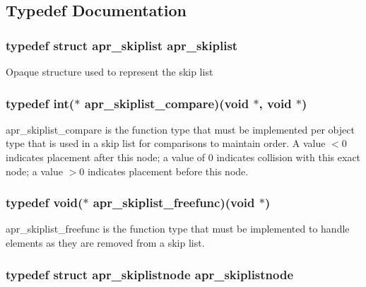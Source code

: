 \subsection{Typedef Documentation}
\hypertarget{group__apr__skiplist_gac79ddf14bb5cb5b6d35961309eadec48}{
\subsubsection[{apr\-\_\-skiplist}]{\setlength{\rightskip}{0pt plus 5cm}typedef struct {\bf apr\-\_\-skiplist} {\bf apr\-\_\-skiplist}}}\label{group__apr__skiplist_gac79ddf14bb5cb5b6d35961309eadec48}
Opaque structure used to represent the skip list \hypertarget{group__apr__skiplist_ga4e5bca4c34a9932deee61c3ac4ed7d4a}{
\subsubsection[{apr\-\_\-skiplist\-\_\-compare}]{\setlength{\rightskip}{0pt plus 5cm}typedef int($\ast$ apr\-\_\-skiplist\-\_\-compare)(void $\ast$, void $\ast$)}}\label{group__apr__skiplist_ga4e5bca4c34a9932deee61c3ac4ed7d4a}
apr\-\_\-skiplist\-\_\-compare is the function type that must be implemented per object type that is used in a skip list for comparisons to maintain order. A value $<$0 indicates placement after this node; a value of 0 indicates collision with this exact node; a value $>$0 indicates placement before this node. \hypertarget{group__apr__skiplist_gaca5605cd1a65a8520e1ead5316cc0a0a}{
\subsubsection[{apr\-\_\-skiplist\-\_\-freefunc}]{\setlength{\rightskip}{0pt plus 5cm}typedef void($\ast$ apr\-\_\-skiplist\-\_\-freefunc)(void $\ast$)}}\label{group__apr__skiplist_gaca5605cd1a65a8520e1ead5316cc0a0a}
apr\-\_\-skiplist\-\_\-freefunc is the function type that must be implemented to handle elements as they are removed from a skip list. \hypertarget{group__apr__skiplist_gafb934f577d03de823aa4d62b41399bc0}{
\subsubsection[{apr\-\_\-skiplistnode}]{\setlength{\rightskip}{0pt plus 5cm}typedef struct {\bf apr\-\_\-skiplistnode} {\bf apr\-\_\-skiplistnode}}}\label{group__apr__skiplist_gafb934f577d03de823aa4d62b41399bc0}
